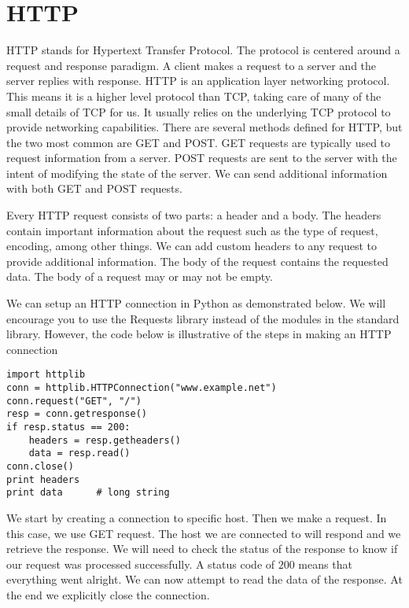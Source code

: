 %

%


\section*{HTTP}
HTTP stands for Hypertext Transfer Protocol.
The protocol is centered around a request and response paradigm.
A client makes a request to a server and the server replies with response.
HTTP is an application layer networking protocol.
This means it is a higher level protocol than TCP, taking care of many of the small details of TCP for us.
It usually relies on the underlying TCP protocol to provide networking capabilities.
There are several methods defined for HTTP, but the two most common are GET and POST.
GET requests are typically used to request information from a server.
POST requests are sent to the server with the intent of modifying the state of the server.  We can send additional information with both GET and POST requests.

Every HTTP request consists of two parts: a header and a body.
The headers contain important information about the request such as the type of request, encoding, among other things.  
We can add custom headers to any request to provide additional information.
The body of the request contains the requested data.
The body of a request may or may not be empty.

We can setup an HTTP connection in Python as demonstrated below.
We will encourage you to use the Requests library instead of the modules in the standard library.
However, the code below is illustrative of the steps in making an HTTP connection
\begin{lstlisting}
import httplib
conn = httplib.HTTPConnection("www.example.net")
conn.request("GET", "/")
resp = conn.getresponse()
if resp.status == 200:
    headers = resp.getheaders()
    data = resp.read()
conn.close()
print headers
print data      # long string
\end{lstlisting}
We start by creating a connection to specific host.
Then we make a request.  In this case, we use GET request.
The host we are connected to will respond and we retrieve the response. 
We will need to check the status of the response to know if our request was processed successfully.
A status code of $200$ means that everything went alright.
We can now attempt to read the data of the response.
At the end we explicitly close the connection.

